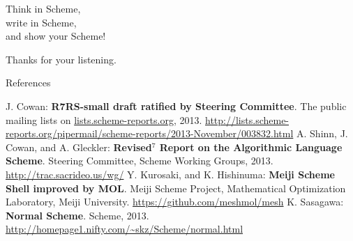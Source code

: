 \documentclass[dvipdfm,12pt,fleqn]{beamer}
\begin{document}
\begin{frame}
\Huge
Think in Scheme,\\
write in Scheme,\\
and show \alert{your Scheme}!

\vspace{1em}
\begin{flushright}
\Large
Thanks for your listening.
\end{flushright}
\end{frame}

\begin{frame}{References}
\footnotesize
\begin{thebibliography}{9}
\beamertemplatetextbibitems
{} J. Cowan: \textbf{R7RS-small draft ratified by Steering Committee}. The public mailing lists on \url{lists.scheme-reports.org}, 2013. \url{http://lists.scheme-reports.org/pipermail/scheme-reports/2013-November/003832.html}
 A. Shinn, J. Cowan, and A. Gleckler: \textbf{Revised$^7$ Report on the Algorithmic Language Scheme}. Steering Committee, Scheme Working Groups, 2013. \url{http://trac.sacrideo.us/wg/}
 Y. Kurosaki, and K. Hishinuma: \textbf{Meiji Scheme Shell improved by MOL}. Meiji Scheme Project, Mathematical Optimization Laboratory, Meiji University. \url{https://github.com/meshmol/mesh}
 K. Sasagawa: \textbf{Normal Scheme}. Scheme, 2013. \url{http://homepage1.nifty.com/~skz/Scheme/normal.html}
\end{thebibliography}
\end{frame}
\end{document}

